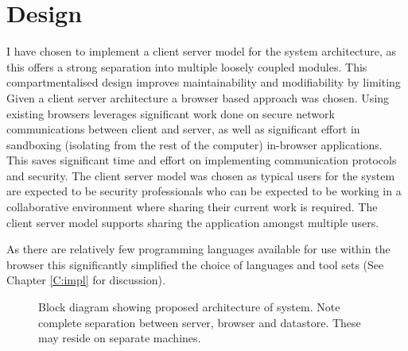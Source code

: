 \chapter{Design}\label{C:design}

I have chosen to implement a client server model for the system architecture, as this offers a strong separation into multiple loosely coupled modules. This compartmentalised design improves maintainability and modifiability by limiting  Given a client server architecture a browser based approach was chosen. Using existing browsers leverages significant work done on secure network communications between client and server, as well as significant effort in sandboxing (isolating from the rest of the computer) in-browser applications. This saves significant time and effort on implementing communication protocols and security.  The client server model was chosen as typical users for the system are expected to be security professionals who can be expected to be working in a collaborative environment where sharing their current work is required. The client server model supports sharing the application amongst multiple users. 

As there are relatively few programming languages available for use within the browser this significantly simplified the choice of languages and tool sets (See Chapter \ref{C:impl} for discussion).

\begin{figure}[tbh]
\caption{\protect\label{spiral_plan}Block diagram showing proposed architecture of system. Note complete separation between server, browser and datastore. These may reside on separate machines.}
\end{figure}

